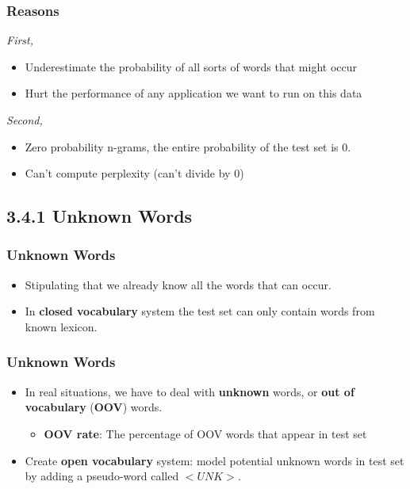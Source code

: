 \documentclass[13.5pt,aspecratio=169]{beamer}
\begin{document}
    \begin{frame}
            \frametitle{Reasons}
        \begin{block}{\textit{First,}}
                \begin{itemize}
                    \item Underestimate the probability of all sorts of words that might occur
                    \item Hurt the performance of any application we want to run on this data
                \end{itemize}
        \end{block}
            \pause
        \begin{block}{\textit{Second,}}
                \begin{itemize}
                    \item Zero probability n-grams, the entire probability of the test set is 0.
                    \item Can’t compute perplexity (can’t divide by 0)
                \end{itemize}
        \end{block}
    \end{frame}
    
    
    \subsection{3.4.1 Unknown Words}
    \begin{frame}
        \frametitle{Unknown Words}
        \begin{itemize}
            \item Stipulating that we already know all the words that can occur.
            \item In \textbf{closed vocabulary} system the test set can only contain words from known lexicon.
        \end{itemize}
    \end{frame}
    
    
    \begin{frame}
        \frametitle{Unknown Words}
        \begin{itemize}
            \item In real situations, we have to deal with \textbf{unknown} words, or \textbf{out of vocabulary} (\textbf{OOV}) words.
            \begin{itemize}
                \item \textbf{OOV rate}: The percentage of OOV words that appear in test set
            \end{itemize}
            \item Create \textbf{open vocabulary} system: model potential unknown words in test set by adding a pseudo-word called $<UNK>$.
        \end{itemize}
    \end{frame}
    
\end{document}
